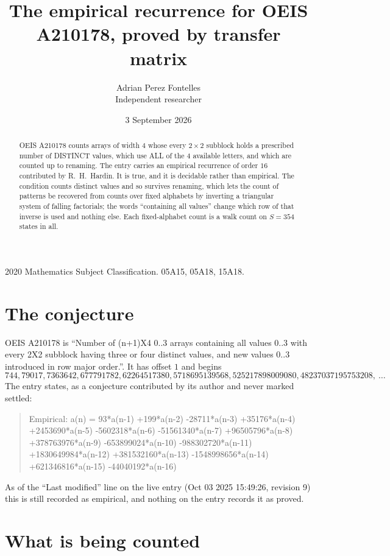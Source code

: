 \documentclass[11pt,a4paper]{article}
\title{The empirical recurrence for OEIS A210178, proved by transfer matrix}
\author{Adrian Perez Fontelles\\ \small Independent researcher}
\date{3 September 2026}
\theoremstyle{plain}
\theoremstyle{definition}
\begin{document}
\maketitle

\begin{abstract}
OEIS A210178 counts arrays of width $4$ whose every $2\times2$ subblock holds a
prescribed number of DISTINCT values, which use ALL of the $4$ available letters, and which
are counted up to renaming. The entry carries an empirical recurrence of order $16$
contributed by R.~H.~Hardin. It is true, and it is decidable rather than empirical. The
condition counts distinct values and so survives renaming, which lets the count of patterns be
recovered from counts over fixed alphabets by inverting a triangular system of falling
factorials; the words ``containing all values'' change which row of that inverse is used and
nothing else. Each fixed-alphabet count is a walk count on $S=354$ states in all.
\end{abstract}

\noindent\small 2020 Mathematics Subject Classification. 05A15, 05A18, 15A18.\normalsize

\section{The conjecture}

OEIS A210178 is ``Number of (n+1)X4 0..3 arrays containing all values 0..3 with every 2X2 subblock having three or four distinct values, and new values 0..3 introduced in row major order.''. It has offset $1$ and begins
\[
744, 79017, 7363642, 677791782, 62264517380, 5718695139568, 525217898009080, 48237037195753208,\ \dots
\]
The entry states, as a conjecture contributed by its author and never marked settled:
\begin{quote}
Empirical: a(n) = 93*a(n-1) +199*a(n-2) -28711*a(n-3) +35176*a(n-4) +2453690*a(n-5) -5602318*a(n-6) -51561340*a(n-7) +96505796*a(n-8) +378763976*a(n-9) -653899024*a(n-10) -988302720*a(n-11) +1830649984*a(n-12) +381532160*a(n-13) -1548998656*a(n-14) +621346816*a(n-15) -44040192*a(n-16)
\end{quote}
As of the ``Last modified'' line on the live entry (Oct 03 2025 15:49:26, revision 9) this is still
recorded as empirical, and nothing on the entry records it as proved.

\section{What is being counted}
\end{document}
